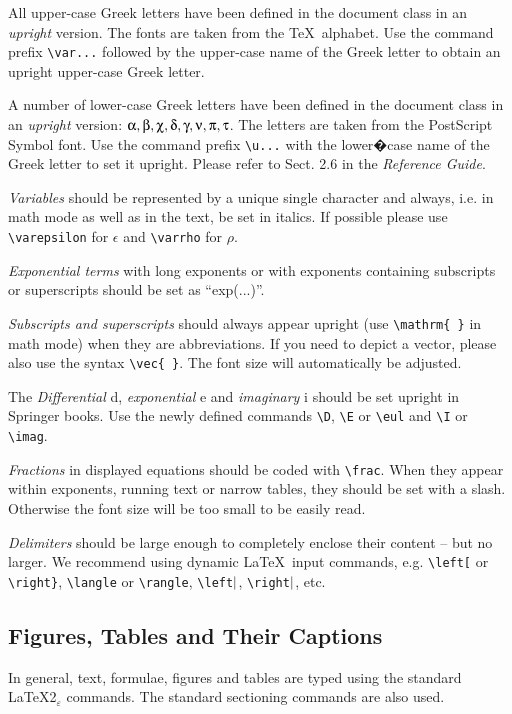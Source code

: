 \documentclass[graybox]{svmono}
\begin{document}
All upper-case Greek letters have been defined in the document class in an {\it upright} version. The fonts are taken from the \TeX~alphabet. Use the command prefix \verb|\var...| followed by the upper-case name of the Greek letter to obtain an upright upper-case Greek letter.

A number of lower-case Greek letters have been defined in the document class in an {\it upright} version: $\ualpha, \ubeta, \uchi, \udelta, \ugamma, \unu, \upi, \utau$. The letters are taken from the PostScript Symbol font. Use the command prefix \verb|\u...| with the lower�case name of the Greek letter to set it upright. Please refer to Sect. 2.6 in the {\it Reference Guide}.

{\it Variables} should be represented by a unique single character and always, i.e. in math mode as well as in the text, be set in italics. If possible please use \verb|\varepsilon| for $\epsilon$ and \verb|\varrho| for $\rho$.

{\it Exponential terms} with long exponents or with exponents containing subscripts or superscripts should be set as ``exp(...)''.

{\it Subscripts and superscripts} should always appear upright (use \verb|\mathrm{ }| in math mode) when they are abbreviations. If you need to depict a vector, please also use the syntax \verb|\vec{ }|. The font size will automatically be adjusted.

The {\it Differential} d, {\it exponential} e and {\it imaginary} i should be set upright in Springer books. Use the newly defined commands \verb|\D|, \verb|\E| or \verb|\eul| and \verb|\I| or \verb|\imag|.

{\it Fractions} in displayed equations should be coded with \verb|\frac|. When they appear within exponents, running text or narrow tables, they should be set with a slash. Otherwise the font size will be too small to be easily read.

{\it Delimiters} should be large enough to completely enclose their content -- but no larger. We recommend using dynamic \LaTeX~input commands, e.g. \verb|\left[| or \verb|\right}|, \verb|\langle| or \verb|\rangle|, \verb|\left|${\tt \vert}$, \verb|\right|${\tt \vert}$, etc.


\subsection{Figures, Tables and Their Captions}

In general, text, formulae, figures and tables are typed using the standard \LaTeX2$_\varepsilon$ commands. The standard sectioning commands are also used.
\end{document}
